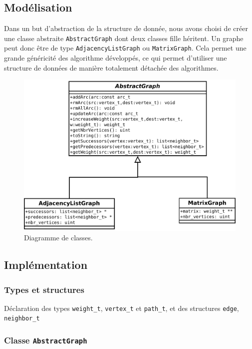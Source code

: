 \subsection{Modélisation}
Dans un but d'abstraction de la structure de donnée, nous avons choisi de créer une classe abstraite \texttt{AbstractGraph} dont deux classes fille héritent. Un graphe peut donc être de type \texttt{AdjacencyListGraph} ou \texttt{MatrixGraph}. Cela permet une grande généricité des algorithme développés, ce qui permet d'utiliser une structure de données de manière totalement détachée des algorithmes.
\begin{figure}[t]
\begin{center}
\includegraphics[width=\textwidth]{files/diag_class}
\end{center}
\caption{Diagramme de classes.}
\end{figure}

\FloatBarrier
\subsection{Implémentation}

\subsubsection{Types et structures}

Déclaration des types \texttt{weight\_t}, \texttt{vertex\_t} et \texttt{path\_t}, et des structures \texttt{edge}, \texttt{neighbor\_t}



\subsubsection{Classe \texttt{AbstractGraph}}

